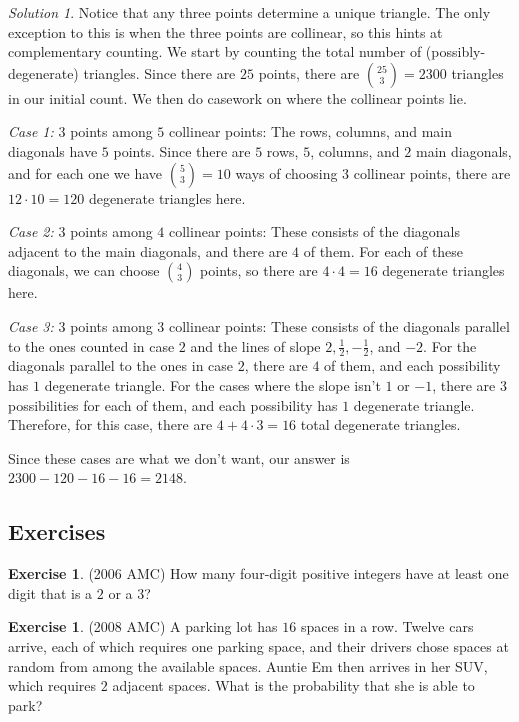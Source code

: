 \documentclass[letterpaper]{article}
\theoremstyle{remark}
\newtheorem*{solution}{Solution}
\theoremstyle{definition}
\newtheorem{exercise}[thm]{Exercise}
\begin{document}
\begin{solution}
Notice that any three points determine a unique triangle. The only exception to this is when the three points are collinear, so this hints at complementary counting. We start by counting the total number of (possibly-degenerate) triangles. Since there are $25$ points, there are $\binom{25}{3}=2300$ triangles in our initial count. We then do casework on where the collinear points lie.

\textit{Case 1:} $3$ points among $5$ collinear points: The rows, columns, and main diagonals have $5$ points. Since there are $5$ rows, $5$, columns, and $2$ main diagonals, and for each one we have $\binom{5}{3}=10$ ways of choosing $3$ collinear points, there are $12\cdot10=120$ degenerate triangles here.
\newline

\textit{Case 2:} $3$ points among $4$ collinear points: These consists of the diagonals adjacent to the main diagonals, and there are $4$ of them. For each of these diagonals, we can choose $\binom{4}{3}$ points, so there are $4\cdot 4=16$ degenerate triangles here.

\textit{Case 3:} $3$ points among $3$ collinear points: These consists of the diagonals parallel to the ones counted in case $2$ and the lines of slope $2,\frac{1}{2}, -\frac{1}{2}$, and $-2$. For the diagonals parallel to the ones in case $2$, there are $4$ of them, and each possibility has $1$ degenerate triangle. For the cases where the slope isn't $1$ or $-1$, there are $3$ possibilities for each of them, and each possibility has $1$ degenerate triangle. Therefore, for this case, there are $4+4\cdot3=16$ total degenerate triangles.

Since these cases are what we don't want, our answer is $2300-120-16-16=2148$.
\end{solution}

\subsection*{Exercises}
\begin{exercise}
(2006 AMC) How many four-digit positive integers have at least one digit that is a $2$ or a $3$?
\end{exercise}

\begin{exercise}
(2008 AMC) A parking lot has $16$ spaces in a row. Twelve cars arrive, each of which requires one parking space, and their drivers chose spaces at random from among the available spaces. Auntie Em then arrives in her SUV, which requires $2$ adjacent spaces. What is the probability that she is able to park?
\end{exercise}
\end{document}
